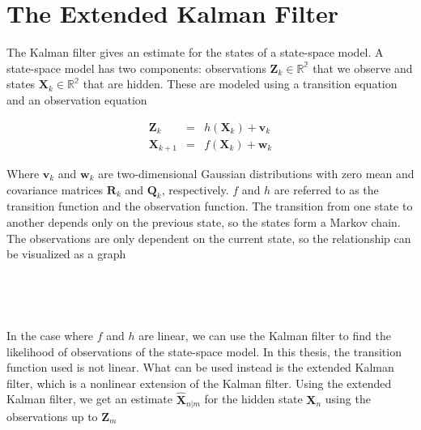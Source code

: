 \parencite{gamerman2006mcmc}
\section{The Extended Kalman Filter}
\label{sec: EKF}

The Kalman filter gives an estimate for the states of a state-space model. A state-space model has two components: observations $\textbf{Z}_k\in \mathbb{R^2}$ that we observe and states $\textbf{X}_k\in \mathbb{R^2}$ that are hidden. These are modeled using a transition equation and an observation equation

$$
\begin{array}{lcl}
\textbf{Z}_k &=& h(\textbf{X}_k) + \textbf{v}_k
\\
\textbf{X}_{k+1} &=& f(\textbf{X}_k) + \textbf{w}_k
\end{array}
$$

 Where $\textbf{v}_k$ and $\textbf{w}_k$ are two-dimensional Gaussian distributions with zero mean and covariance matrices $\textbf{R}_k$ and $\textbf{Q}_k$, respectively. $f$ and $h$ are referred to as the transition function and the observation function. The transition from one state to another depends only on the previous state, so the states form a Markov chain. The observations are only dependent on the current state, so the relationship can be visualized as a graph

 \

\begin{center}
\end{center}
\ 
 
 In the case where $f$ and $h$ are linear, we can use the Kalman filter to find the likelihood of observations of the state-space model. In this thesis, the transition function used is not linear. What can be used instead is the extended Kalman filter, which is a nonlinear extension of the Kalman filter. Using the extended Kalman filter, we get an estimate $\hat{\textbf{X}}_{n|m}$ for the hidden state $\textbf{X}_n$ using the observations up to $\textbf{Z}_m$


